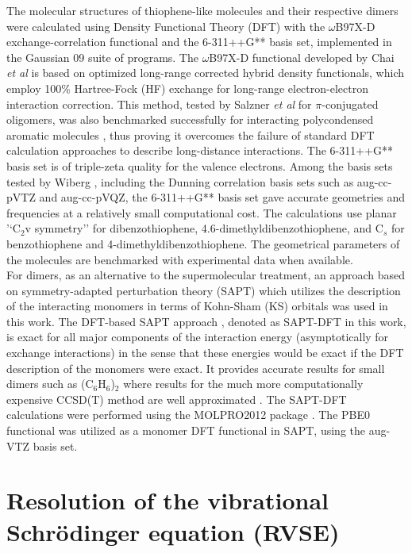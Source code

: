 	The molecular structures of thiophene-like molecules and their respective dimers were calculated using Density Functional Theory (DFT) with the $\omega$B97X-D exchange-correlation functional and the   6-311++G** basis set, implemented in the Gaussian 09 suite of programs. The $\omega$B97X-D functional developed by Chai \textit{et al} \cite{chai2008systematic} is based on optimized long-range corrected hybrid density functionals, which employ 100\% Hartree-Fock (HF) exchange for long-range electron-electron interaction correction. This method, tested by Salzner \textit{et al} \cite{salzner2011improved} for $\pi$-conjugated oligomers, was also benchmarked successfully for interacting polycondensed aromatic molecules \cite{spillebout2014discerning}, thus proving it overcomes the failure of standard DFT calculation approaches to describe long-distance interactions. The 6-311++G** basis set is of triple-zeta quality for the valence electrons. Among the basis sets tested by Wiberg \cite{wiberg2004basis}, including the Dunning correlation basis sets such as aug-cc-pVTZ and aug-cc-pVQZ, the 6-311++G** basis set gave accurate geometries and frequencies at a relatively small computational cost. The calculations use planar '‘C$_{2}$v symmetry’' for dibenzothiophene, 4.6-dimethyldibenzothiophene, and C$_{s}$ for benzothiophene and 4-dimethyldibenzothiophene. The geometrical parameters of the molecules are benchmarked with experimental data when available.\\
	
	For dimers, as an alternative to the supermolecular treatment, an approach based on symmetry-adapted perturbation theory (SAPT) \cite{jeziorski1994perturbation} which utilizes the description of the interacting monomers in terms of Kohn-Sham (KS) orbitals was used in this work. The DFT-based SAPT approach \cite{hesselmann2005density}, denoted as SAPT-DFT in this work, is exact for all major components of the interaction energy (asymptotically for exchange interactions) in the sense that these energies would be exact if the DFT description of the monomers were exact. It provides accurate results for small dimers such as (C$_{6}$H$_{6}$)$_{2}$ where results for the much more computationally expensive CCSD(T) method are well approximated \cite{podeszwa2006potential}. The SAPT-DFT calculations were performed using the MOLPRO2012 package \cite{MOLPRO_brief}. The PBE0 functional \cite{adamo1999toward} was utilized as a monomer DFT functional in SAPT, using the aug-VTZ basis set.
	
	\section{Resolution of the vibrational Schr\"{o}dinger equation  (RVSE)}
	
